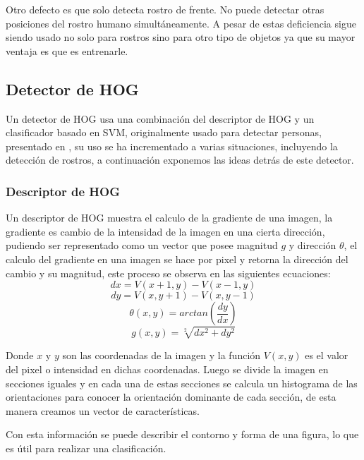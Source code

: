 Otro defecto es que solo detecta rostro de frente. No puede detectar otras posiciones del rostro humano simultáneamente. A pesar de estas deficiencia sigue siendo usado no solo para rostros sino para otro tipo de objetos ya que su mayor ventaja es que es entrenarle.

\subsection{Detector de \acf{HOG}}
Un detector de \acf{HOG} usa una combinación del descriptor de \ac{HOG} y un clasificador basado en \acf{SVM}, originalmente usado para detectar personas, presentado en \cite{dalal2005histograms}, su uso se ha incrementado a varias situaciones, incluyendo la detección de rostros, a continuación exponemos las ideas detrás de este detector.
\subsubsection{Descriptor de \ac{HOG}}
Un descriptor de \ac{HOG} muestra el calculo de la gradiente de una imagen, la gradiente es cambio de la intensidad de la imagen en una cierta dirección, pudiendo ser representado como un vector que posee magnitud $g$ y dirección $\theta$, el calculo del gradiente en una imagen se hace por pixel y retorna la dirección del cambio y su magnitud, este proceso se observa en las siguientes ecuaciones:
\begin{equation}
dx=V(x+1,y)-V(x-1,y)
\end{equation}
\begin{equation}
dy=V(x,y+1)-V(x,y-1)
\end{equation}
\begin{equation}
\theta(x,y)=arctan\left(\frac{dy}{dx}\right)
\end{equation}
\begin{equation}
g(x,y)=\sqrt[2]{dx^2+dy^2}
\end{equation}

Donde $x$ y $y$ son las coordenadas de la imagen y la función $V(x,y)$ es el valor del pixel o intensidad en dichas coordenadas. Luego se divide la imagen en secciones iguales y en cada una de estas secciones se calcula un histograma de las orientaciones para conocer la orientación dominante de cada sección, de esta manera creamos un vector de características.

Con esta información se puede describir el contorno y forma de una figura, lo que es útil para realizar una clasificación.

